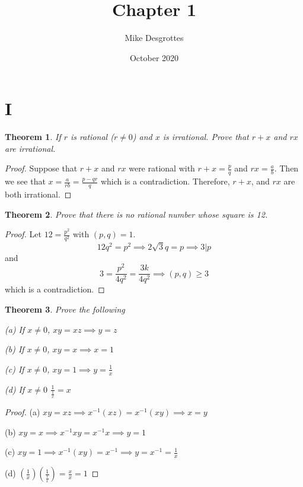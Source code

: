 \documentclass{article}
\title{Chapter 1}
\author{Mike Desgrottes}
\date{October 2020}
\theoremstyle{plain}
\newtheorem{theorem}{Theorem}
\theoremstyle{definition}
\begin{document}
\maketitle

\section{I}
\begin{theorem}
	If $r$ is rational ($r \not = 0$) and $x$ is irrational. Prove that $r + x$ and $rx$ are irrational.
\end{theorem}

\begin{proof}
	Suppose that $r + x$ and $rx$ were rational with $r + x = \frac{p}{q}$ and $rx = \frac{a}{b}$. Then we see that $x = \frac{a}{rb} = \frac{p - qr}{q}$ which is a contradiction. Therefore, $r + x$, and $rx$ are both irrational.
\end{proof}

\begin{theorem}
	Prove that there is no rational number whose square is 12.
\end{theorem}
\begin{proof}
	Let $12 = \frac{p^{2}}{q^{2}}$ with $(p,q) = 1$. $$12q^{2} = p^{2} \implies 2\sqrt{3}q = p \implies 3 | p $$ and $$3 = \frac{p^{2}}{4q^{2}} = \frac{3k}{4q^{2}} \implies (p,q) \geq  3 $$ which is a contradiction.
\end{proof}

\begin{theorem}
	Prove the following

	(a) If $x \not = 0$, $xy = xz \implies y = z$

	(b) If $x \not = 0$, $xy = x \implies x = 1$

	(c) If $x \not = 0$, $xy = 1 \implies y = \frac{1}{x}$

	(d) If $x \not = 0$ $\frac{1}{\frac{1}{x}} = x$
\end{theorem}

\begin{proof}
	(a) $xy = xz \implies x^{-1}(xz) = x^{-1}(xy) \implies x = y$

	(b) $xy = x \implies x^{-1}xy = x^{-1}x \implies y = 1$

	(c) $xy = 1 \implies x^{-1}(xy) = x^{-1} \implies y = x^{-1} = \frac{1}{x}$

	(d) $(\frac{1}{x})(\frac{1}{\frac{1}{x}}) = \frac{x}{x} = 1$
\end{proof}
\end{document}
